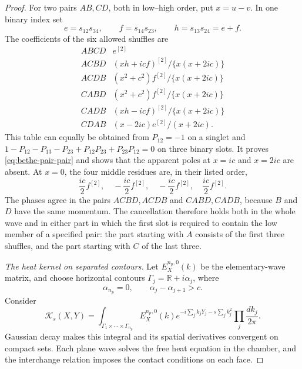 \begin{proof}
For two pairs \(AB,CD\), both in low--high order, put \(x=u-v\).
In one binary index set
\[
        e=s_{12}s_{34},\qquad f=s_{14}s_{23},\qquad
        h=s_{13}s_{24}=e+f.
\]
The coefficients of the six allowed shuffles are
\[
\begin{array}{c|c}
 ABCD & e^{[2]}\\[2pt]
 ACBD & (xh+icf)^{[2]}/\{x(x+2ic)\}\\[2pt]
 ACDB & (x^2+c^2)f^{[2]}/\{x(x+2ic)\}\\[2pt]
 CABD & (x^2+c^2)f^{[2]}/\{x(x+2ic)\}\\[2pt]
 CADB & (xh-icf)^{[2]}/\{x(x+2ic)\}\\[2pt]
 CDAB & (x-2ic)e^{[2]}/(x+2ic).
\end{array}
\]
This table can equally be obtained from \(P_{12}=-1\) on a singlet
and
\(1-P_{12}-P_{13}-P_{23}+P_{12}P_{23}+P_{23}P_{12}=0\)
on three binary slots.  It proves \eqref{eq:bethe-pair-pair} and
shows that the apparent poles at \(x=ic\) and \(x=2ic\) are absent.
At \(x=0\), the four middle residues are, in their listed order,
\[
       \frac{ic}{2}f^{[2]},\quad
       -\frac{ic}{2}f^{[2]},\quad
       -\frac{ic}{2}f^{[2]},\quad
       \frac{ic}{2}f^{[2]}.
\]
The phases agree in the pairs \(ACBD,ACDB\) and \(CABD,CADB\),
because \(B\) and \(D\) have the same momentum.  The cancellation
therefore holds both in the whole wave and in either part in which
the first slot is required to contain the low member of a specified
pair: the part starting with \(A\) consists of the first three
shuffles, and the part starting with \(C\) of the last three.

\emph{The heat kernel on separated contours.}
Let \(E_X^{n_p,0}(k)\) be the elementary-wave matrix, and choose
horizontal contours
\(\Gamma_j=\mathbb R+i\alpha_j\), where
\[
 \alpha_{n_p}=0,\qquad \alpha_j-\alpha_{j+1}>c.
\]
Consider
\begin{equation}
 \mathcal K_s(X,Y)=
 \int_{\Gamma_1\times\cdots\times\Gamma_{n_p}}
 E_X^{n_p,0}(k)
 e^{-i\sum_j k_jY_j-s\sum_j k_j^2}
 \prod_j\frac{dk_j}{2\pi}.
\label{eq:bethe-separated-contours}
\end{equation}
Gaussian decay makes this integral and its spatial derivatives
convergent on compact sets.  Each plane wave solves the free heat
equation in the chamber, and the interchange relation imposes the
contact conditions on each face.


\end{proof}
